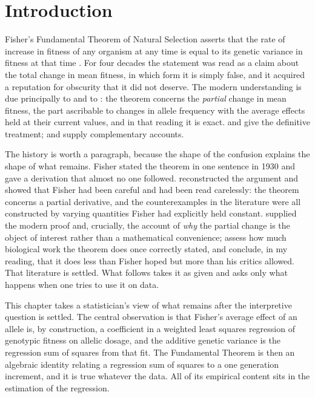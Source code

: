 \section{Introduction}

Fisher's Fundamental Theorem of Natural Selection asserts that the rate of increase in fitness of any organism at any time is equal to its genetic variance in fitness at that time \citep{hs:fisher1930genetical}. For four decades the statement was read as a claim about the total change in mean fitness, in which form it is simply false, and it acquired a reputation for obscurity that it did not deserve. The modern understanding is due principally to \citet{hs:price1972fisher} and to \citet{hs:ewens1989interpretation}: the theorem concerns the \emph{partial} change in mean fitness, the part ascribable to changes in allele frequency with the average effects held at their current values, and in that reading it is exact. \citet{hs:ewens2004mathematical} and \citet{hs:ewens2015interpretation} give the definitive treatment; \citet{hs:edwards1994fundamental} and \citet{hs:lessard1997fisher} supply complementary accounts.


The history is worth a paragraph, because the shape of the confusion explains the shape of what remains. Fisher stated the theorem in one sentence in 1930 and gave a derivation that almost no one followed. \citet{hs:price1972fisher} reconstructed the argument and showed that Fisher had been careful and had been read carelessly: the theorem concerns a partial derivative, and the counterexamples in the literature were all constructed by varying quantities Fisher had explicitly held constant. \citet{hs:ewens1989interpretation} supplied the modern proof and, crucially, the account of \emph{why} the partial change is the object of interest rather than a mathematical convenience; \citet{hs:ewens2015interpretation} assess how much biological work the theorem does once correctly stated, and conclude, in my reading, that it does less than Fisher hoped but more than his critics allowed. That literature is settled. What follows takes it as given and asks only what happens when one tries to use it on data.

This chapter takes a statistician's view of what remains after the interpretive question is settled. The central observation is that Fisher's average effect of an allele is, by construction, a coefficient in a weighted least squares regression of genotypic fitness on allelic dosage, and the additive genetic variance is the regression sum of squares from that fit. The Fundamental Theorem is then an algebraic identity relating a regression sum of squares to a one generation increment, and it is true whatever the data. All of its empirical content sits in the estimation of the regression.

